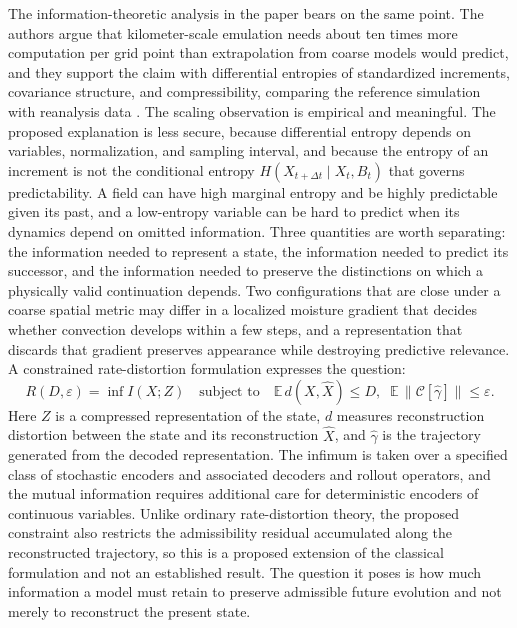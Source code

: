 \documentclass[11pt]{article}
\theoremstyle{definition}
\theoremstyle{remark}
\begin{document}
The information-theoretic analysis in the paper bears on the same point. The authors argue that kilometer-scale emulation needs about ten times more computation per grid point than extrapolation from coarse models would predict, and they support the claim with differential entropies of standardized increments, covariance structure, and compressibility, comparing the reference simulation with reanalysis data \cite{hersbach2020era5}. The scaling observation is empirical and meaningful. The proposed explanation is less secure, because differential entropy depends on variables, normalization, and sampling interval, and because the entropy of an increment is not the conditional entropy $H(X_{t+\Delta t}\mid X_t, B_t)$ that governs predictability. A field can have high marginal entropy and be highly predictable given its past, and a low-entropy variable can be hard to predict when its dynamics depend on omitted information. Three quantities are worth separating: the information needed to represent a state, the information needed to predict its successor, and the information needed to preserve the distinctions on which a physically valid continuation depends. Two configurations that are close under a coarse spatial metric may differ in a localized moisture gradient that decides whether convection develops within a few steps, and a representation that discards that gradient preserves appearance while destroying predictive relevance. A constrained rate-distortion formulation \cite{cover2006elements} expresses the question:
\begin{equation}
R(D,\varepsilon) = \inf I(X;Z) \quad\text{subject to}\quad \mathbb E\,d(X,\widehat X)\le D,\;\; \mathbb E\,\|\mathcal C[\widehat\gamma]\|\le\varepsilon.
\end{equation}
Here $Z$ is a compressed representation of the state, $d$ measures reconstruction distortion between the state and its reconstruction $\widehat X$, and $\widehat\gamma$ is the trajectory generated from the decoded representation. The infimum is taken over a specified class of stochastic encoders and associated decoders and rollout operators, and the mutual information requires additional care for deterministic encoders of continuous variables. Unlike ordinary rate-distortion theory, the proposed constraint also restricts the admissibility residual accumulated along the reconstructed trajectory, so this is a proposed extension of the classical formulation and not an established result. The question it poses is how much information a model must retain to preserve admissible future evolution and not merely to reconstruct the present state.
\end{document}
